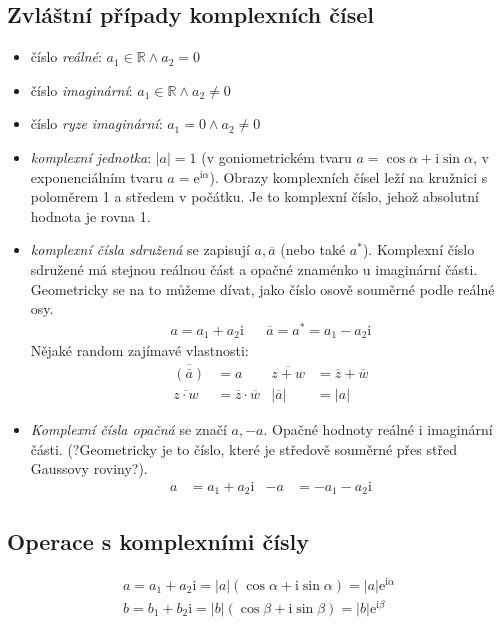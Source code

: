 \documentclass[12pt]{article}
\providecommand{\abs}[1]{\lvert#1\rvert}
\newcommand{\euler}{\mathrm{e}} %
\newcommand{\iu}{\mathrm{i}} %
\newcommand{\nR}{\mathbb{R}} %
\begin{document}
\subsection{Zvláštní případy komplexních čísel}
\begin{itemize}
\item číslo \emph{reálné}: $a_1 \in \nR \land a_2 = 0$
\item číslo \emph{imaginární}: $a_1 \in \nR \land a_2 \neq 0$
\item číslo \emph{ryze imaginární}: $a_1 = 0 \land a_2 \neq 0$
\item \emph{komplexní jednotka}: $\abs{a} = 1$  (v goniometrickém tvaru $a = \cos \alpha + \iu \sin \alpha$, v exponenciálním tvaru $a = \euler^{\iu \alpha}$). Obrazy komplexních čísel leží na kružnici s poloměrem 1 a středem v počátku. Je to komplexní číslo, jehož absolutní hodnota je rovna 1.
\item \emph{komplexní čísla sdružená} se zapisují $a, \overline{a}$ (nebo také $a^*$). Komplexní číslo sdružené má stejnou reálnou část a opačné znaménko u imaginární části. Geometricky se na to můžeme dívat, jako číslo osově souměrné podle reálné osy.
\begin{align}
a = a_1 + a_2 \iu && \overline{a}=a^*=a_1 - a_2 \iu
\end{align}
Nějaké random zajímavé vlastnosti:
\begin{align*}
\overline{(\overline{a})} &= a & \overline{z + w} &= \overline{z} + \overline{w} \\
\overline{z \cdot w} &= \overline{z} \cdot \overline{w} & \abs{\overline{a}} &= \abs{a}
\end{align*}
\item \emph{Komplexní čísla opačná} se značí $a, -a$. Opačné hodnoty reálné i imaginární části. (?Geometricky je to číslo, které je středově  souměrné přes střed Gaussovy roviny?).
\begin{align}
a &= a_1 + a_2 \iu & -a &= -a_1 -a_2 \iu
\end{align}
\end{itemize}
\subsection{Operace s komplexními čísly}
\begin{align}
a = a_1 + a_2 \iu = \abs{a}(\cos \alpha + \iu \sin \alpha) = \abs{a} \euler^{\iu \alpha}\\
b = b_1 + b_2 \iu = \abs{b}(\cos \beta + \iu \sin \beta) = \abs{b} \euler^{\iu \beta}
\end{align}
\end{document}
